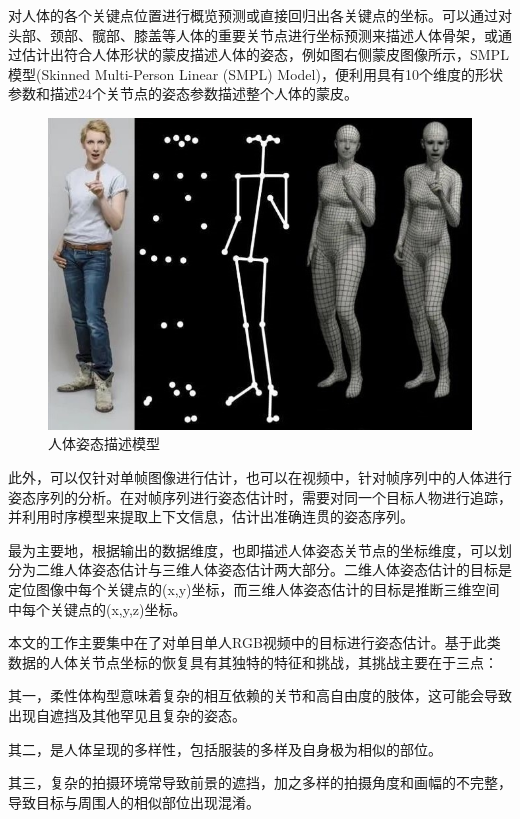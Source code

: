 对人体的各个关键点位置进行概览预测或直接回归出各关键点的坐标。可以通过对头部、颈部、髋部、膝盖等人体的重要关节点进行坐标预测来描述人体骨架，或通过估计出符合人体形状的蒙皮描述人体的姿态，例如图右侧蒙皮图像所示，SMPL模型(Skinned Multi-Person Linear (SMPL) Model)，便利用具有10个维度的形状参数和描述24个关节点的姿态参数描述整个人体的蒙皮。

\begin{figure}[h]
	\centering
	\includegraphics[scale=0.4]{figures/4.jpg}
	\caption{人体姿态描述模型}
	\label{fig:f4}
\end{figure}

此外，可以仅针对单帧图像进行估计，也可以在视频中，针对帧序列中的人体进行姿态序列的分析。在对帧序列进行姿态估计时，需要对同一个目标人物进行追踪，并利用时序模型来提取上下文信息，估计出准确连贯的姿态序列。

最为主要地，根据输出的数据维度，也即描述人体姿态关节点的坐标维度，可以划分为二维人体姿态估计与三维人体姿态估计两大部分。二维人体姿态估计的目标是定位图像中每个关键点的(x,y)坐标，而三维人体姿态估计的目标是推断三维空间中每个关键点的(x,y,z)坐标。

本文的工作主要集中在了对单目单人RGB视频中的目标进行姿态估计。基于此类数据的人体关节点坐标的恢复具有其独特的特征和挑战，其挑战主要在于三点：

其一，柔性体构型意味着复杂的相互依赖的关节和高自由度的肢体，这可能会导致出现自遮挡及其他罕见且复杂的姿态。

其二，是人体呈现的多样性，包括服装的多样及自身极为相似的部位。

其三，复杂的拍摄环境常导致前景的遮挡，加之多样的拍摄角度和画幅的不完整，导致目标与周围人的相似部位出现混淆。



